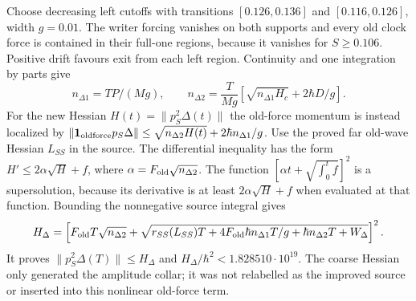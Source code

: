 \documentclass[11pt]{article}
\theoremstyle{definition}\newtheorem{definition}[theorem]{Definition}
\theoremstyle{remark}\newtheorem{remark}[theorem]{Remark}
\newcommand{\one}{\mathbf1}\newcommand{\R}{\mathbb R}\newcommand{\T}{\mathbb T}
\begin{document}
Choose decreasing left cutoffs with transitions $[0.126,0.136]$ and
$[0.116,0.126]$, width $g=0.01$. The writer forcing vanishes on
both supports and every old clock force is contained in their full-one
regions, because it vanishes for $S\ge0.106$. Positive drift favours
exit from each left region. Continuity and one integration by parts give
\begin{equation}
 n_{\Delta1}=TP/(Mg),\qquad
 n_{\Delta2}=\frac{T}{Mg}
       [\sqrt{n_{\Delta1}H_c}+2\hbar D/g].
 \label{prep:delta-collars}
\end{equation}
For the new Hessian $H(t)=\|p_S^2\Delta(t)\|$ the old-force
momentum is instead localized by
$\|\one_{\rm oldforce}p_S\Delta\|
\le\sqrt{n_{\Delta2}H(t)}+2\hbar n_{\Delta1}/g$.
Use the proved far old-wave Hessian $L_{SS}$ in the source.
The differential inequality has the form $H\prime\le2\alpha\sqrt H+f$,
where $\alpha=F_{\rm old}\sqrt{n_{\Delta2}}$. The function
$[\alpha t+\sqrt{\int_0^t f}]^2$ is a supersolution, because its
derivative is at least $2\alpha\sqrt H+f$ when evaluated at that
function. Bounding the nonnegative source integral gives
\begin{equation}
 H_\Delta=\left[F_{\rm old}T\sqrt{n_{\Delta2}}+
 \sqrt{r_{SS}(L_{SS})T+4F_{\rm old}\hbar n_{\Delta1}T/g
                         +\hbar n_{\Delta2}T+W_\Delta}\right]^2.
 \label{prep:improved-hessian}
\end{equation}
It proves $\|p_S^2\Delta(T)\|\le H_\Delta$ and
$H_\Delta/\hbar^2<1.828510\cdot10^{19}$.
The coarse Hessian only generated the amplitude collar; it was not
relabelled as the improved source or inserted into this nonlinear
old-force term.
\end{document}
